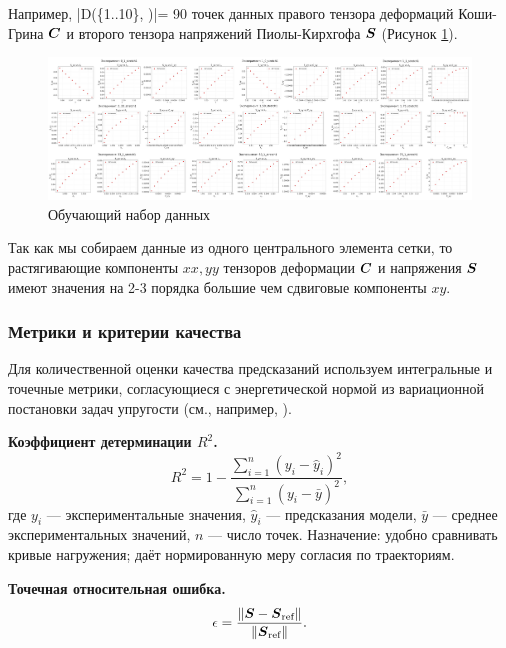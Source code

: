 Например, |D(\{1..10\}, )|= 90 точек данных правого тензора деформаций Коши-Грина $\boldsymbol{C}$ 
и второго тензора напряжений Пиолы-Кирхгофа $\boldsymbol{S}$ (Рисунок \ref{fig:training_data}).

\begin{figure}[H]
  \centering
  \includegraphics[width=1.0\textwidth]{img/all_stress_plots.png}
  \caption{Обучающий набор данных}
  \label{fig:training_data}
\end{figure}

Так как мы собираем данные из одного центрального элемента сетки, то растягивающие компоненты $xx, yy$ тензоров деформации $\boldsymbol{C}$ и напряжения
$\boldsymbol{S}$ имеют значения на 2-3 порядка большие чем сдвиговые компоненты $xy$.

\subsubsection{Метрики и критерии качества}
\label{sec:metrics}

Для количественной оценки качества предсказаний используем интегральные и точечные метрики, согласующиеся с энергетической нормой из вариационной постановки задач упругости (см., например, \cite{ciarlet1988mathematical,ogden1997nonlinear,holzapfel2000nonlinear}).

\textbf{Коэффициент детерминации $R^2$.}
\begin{equation}\label{eq:r_squared}
  R^2 = 1 - \frac{\sum_{i=1}^n (y_i - \hat{y}_i)^2}{\sum_{i=1}^n (y_i - \bar{y})^2},
\end{equation}
где $y_i$ — экспериментальные значения, $\hat{y}_i$ — предсказания модели, $\bar{y}$ — среднее экспериментальных значений, $n$ — число точек. Назначение: удобно сравнивать кривые нагружения; даёт нормированную меру согласия по траекториям.

\textbf{Точечная относительная ошибка.}
\begin{equation}\label{eq:rel_error}
  \epsilon = \frac{\| \boldsymbol{S} - \boldsymbol{S}_{\text{ref}} \|}{\| \boldsymbol{S}_{\text{ref}} \|}.
\end{equation}

